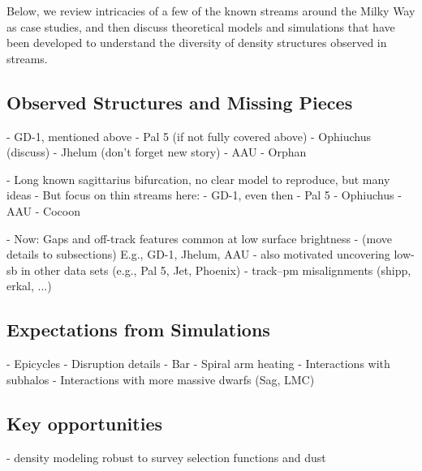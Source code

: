 \documentclass[final,5p,times,twocolumn,authoryear]{elsarticle}
\begin{document}
Below, we review intricacies of a few of the known streams around the Milky Way as case
studies, and then discuss theoretical models and simulations that have been developed to
understand the diversity of density structures observed in streams.


\subsection{Observed Structures and Missing Pieces}

- GD-1, mentioned above
- Pal 5 (if not fully covered above)
- Ophiuchus (discuss)
- Jhelum (don't forget new story)
- AAU
- Orphan


- Long known sagittarius bifurcation, no clear model to reproduce, but many ideas
- But focus on thin streams here:
- GD-1, even then
- Pal 5
- Ophiuchus
- AAU
- Cocoon

- Now: Gaps and off-track features common at low surface brightness
- (move details to subsections) E.g., GD-1, Jhelum, AAU
- also motivated uncovering low-sb in other data sets (e.g., Pal 5, Jet, Phoenix)
- track--pm misalignments (shipp, erkal, ...)

\subsection{Expectations from Simulations}

- Epicycles
- Disruption details
- Bar
- Spiral arm heating
- Interactions with subhalos
- Interactions with more massive dwarfs (Sag, LMC)


\subsection{Key opportunities}
- density modeling robust to survey selection functions and dust



\end{document}
